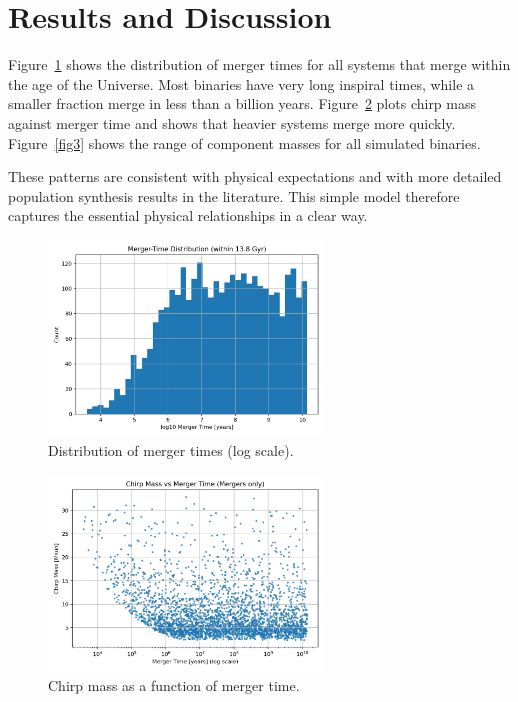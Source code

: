 \documentclass[12pt,a4paper]{article}
\begin{document}
\section{Results and Discussion}
Figure~\ref{fig1} shows the distribution of merger times for all systems that merge within the age of the Universe. 
Most binaries have very long inspiral times, while a smaller fraction merge in less than a billion years.  
Figure~\ref{fig2} plots chirp mass against merger time and shows that heavier systems merge more quickly.  
Figure~\ref{fig3} shows the range of component masses for all simulated binaries.

These patterns are consistent with physical expectations and with more detailed population synthesis results in the literature.  
This simple model therefore captures the essential physical relationships in a clear way.

\begin{figure}[H]

\centering
\includegraphics[width=0.65\textwidth]{merger_times_hist.png}
\caption{Distribution of merger times (log scale).}
\label{fig1}
\end{figure}

\begin{figure}[H]

\centering
\includegraphics[width=0.65\textwidth]{chirp_vs_tmerge.png}
\caption{Chirp mass as a function of merger time.}
\label{fig2}
\end{figure}
\end{document}
